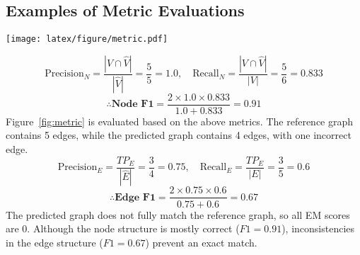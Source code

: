 \subsection{Examples of Metric Evaluations}
\begin{figure*}[!htbp]
    \centering
    \texttt{[image: latex/figure/metric.pdf]}
    \caption{Example for explaining evaluation metrics. Based on real data, but node and edge attributes have been modified due to security issues.}
    \label{fig:metric}
\end{figure*}

\begin{equation}
\nonumber
\text{Precision}_N = \frac{|V \cap \hat{V}|}{|\hat{V}|} = \frac{5}{5} = 1.0, \quad
\text{Recall}_N = \frac{|V \cap \hat{V}|}{|V|} = \frac{5}{6} = 0.833
\end{equation}
\begin{equation}
\nonumber
\therefore \textbf{Node F1} = \frac{2 \times 1.0 \times 0.833}{1.0 + 0.833} = 0.91
\end{equation}
Figure~\ref{fig:metric} is evaluated based on the above metrics. The reference graph contains 5 edges, while the predicted graph contains 4 edges, with one incorrect edge.
\begin{equation}
\nonumber
\text{Precision}_E = \frac{TP_E}{|\hat{E}|} = \frac{3}{4} = 0.75, \quad
\text{Recall}_E = \frac{TP_E}{|E|} = \frac{3}{5} = 0.6
\end{equation}
\begin{equation}
\nonumber
\therefore \textbf{Edge F1} = \frac{2 \times 0.75 \times 0.6}{0.75 + 0.6} = 0.67
\end{equation}
The predicted graph does not fully match the reference graph, so all EM scores are 0. Although the node structure is mostly correct (\( F1 = 0.91 \)), inconsistencies in the edge structure (\( F1 = 0.67 \)) prevent an exact match.